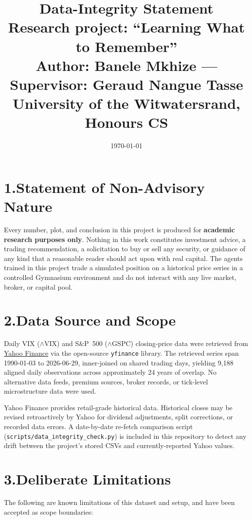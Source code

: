 \documentclass[11pt,a4paper]{article}
\title{\vspace{-2cm}Data-Integrity Statement\\\large Research project: ``Learning What to Remember''\\\normalsize Author: Banele Mkhize --- Supervisor: Geraud Nangue Tasse\\\normalsize University of the Witwatersrand, Honours CS}
\date{\today}
\begin{document}
\maketitle
\vspace{-1cm}

\section{1.\quad Statement of Non-Advisory Nature}

Every number, plot, and conclusion in this project is produced for
\textbf{academic research purposes only}. Nothing in this work constitutes
investment advice, a trading recommendation, a solicitation to buy or sell
any security, or guidance of any kind that a reasonable reader should act
upon with real capital. The agents trained in this project trade a
simulated position on a historical price series in a controlled Gymnasium
environment and do not interact with any live market, broker, or capital
pool.

\section{2.\quad Data Source and Scope}

Daily VIX ($\wedge$VIX) and S\&P~500 ($\wedge$GSPC) closing-price data were
retrieved from \href{https://finance.yahoo.com/}{Yahoo Finance} via the
open-source \texttt{yfinance} library. The retrieved series span 1990-01-03
to 2026-06-29, inner-joined on shared trading days, yielding 9{,}188
aligned daily observations across approximately 24 years of overlap.
No alternative data feeds, premium sources, broker records, or tick-level
microstructure data were used.

Yahoo Finance provides retail-grade historical data. Historical closes may
be revised retroactively by Yahoo for dividend adjustments, split
corrections, or recorded data errors. A date-by-date re-fetch comparison
script (\texttt{scripts/data\_integrity\_check.py}) is included in this
repository to detect any drift between the project's stored CSVs and
currently-reported Yahoo values.

\section{3.\quad Deliberate Limitations}

The following are known limitations of this dataset and setup, and have
been accepted as scope boundaries:
\end{document}

